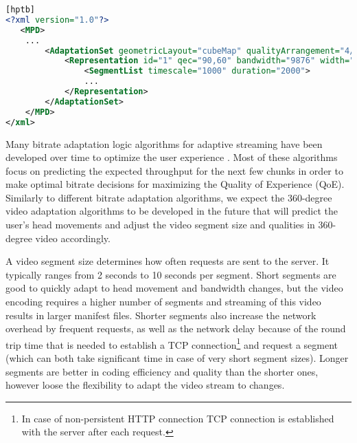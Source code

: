 \begin{lstlisting}[language=xml, frame=single, backgroundcolor=\color{white}, caption=Extensions of MPD file, label=mpdChanges][hptb]
<?xml version="1.0"?>
   <MPD>
    ...
        <AdaptationSet geometricLayout="cubeMap" qualityArrangement="4/1/1">
            <Representation id="1" qec="90,60" bandwidth="9876" width="1920" height="1080" frameRate="30">
                <SegmentList timescale="1000" duration="2000">
                ...
            </Representation>
        </AdaptationSet>
    </MPD>
</xml>
\end{lstlisting}

 Many bitrate adaptation logic algorithms for adaptive streaming have been developed over time to optimize the user experience \cite{tian}\cite{probe_li_2014}\cite{miller}\cite{zou}\cite{liu}. Most of these algorithms focus on predicting the expected throughput for the next few chunks in order to make optimal bitrate decisions for maximizing the Quality of Experience (QoE). Similarly to different bitrate adaptation algorithms, we expect the 360-degree video adaptation algorithms to be developed in the future that will predict the user's head movements and adjust the video segment size and qualities in 360-degree video accordingly. %


 A video segment size determines how often requests are sent to the server. It typically ranges from 2 seconds to 10 seconds per segment. Short segments are good to quickly adapt to head movement and bandwidth changes, but the video encoding requires a higher number of segments and streaming of this video results in larger manifest files. Shorter segments also increase the network overhead by frequent requests, as well as the network delay because of the round trip time that is needed to establish a TCP connection\footnote{In case of non-persistent HTTP connection TCP connection is established with the server after each request.} and request a segment (which can both take significant time in case of very short segment sizes). Longer segments are better in coding efficiency and quality than the shorter ones, however loose the flexibility to adapt the video stream to changes.


